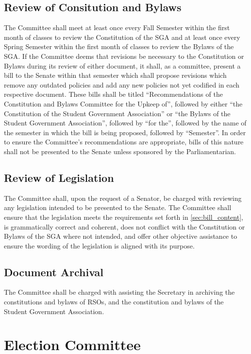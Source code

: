 \documentclass[12pt]{scrreprt}
\begin{document}
\subsection{Review of Consitution and Bylaws}
The Committee shall meet at least once every Fall Semester within the first month of classes to review the Constitution of the SGA and at least once every Spring Semester within the first month of classes to review the Bylaws of the SGA. If the Committee deems that revisions be necessary to the Constitution or Bylaws during its review of either document, it shall, as a committee, present a bill to the Senate within that semester which shall propose revisions which remove any outdated policies and add any new policies not yet codified in each respective document. These bills shall be titled “Recommendations of the Constitution and Bylaws Committee for the Upkeep of”, followed by either “the Constitution of the Student Government Association” or “the Bylaws of the Student Government Association”, followed by “for the”, followed by the name of the semester in which the bill is being proposed, followed by “Semester”. In order to ensure the Committee’s recommendations are appropriate, bills of this nature shall not be presented to the Senate unless sponsored by the Parliamentarian.

\subsection{Review of Legislation}
The Committee shall, upon the request of a Senator, be charged with reviewing any legislation intended to be presented to the Senate. The Committee shall ensure that the legislation meets the requirements set forth in \ref{sec:bill_content}, is grammatically correct and coherent, does not conflict with the Constitution or Bylaws of the SGA where not intended, and offer other objective assistance to ensure the wording of the legislation is aligned with its purpose.

\subsection{Document Archival} \label{sec:document_archival}
The Committee shall be charged with assisting the Secretary in archiving the 
constitutions and bylaws of RSOs, and the constitution and bylaws of the 
Student Government Association.

\section{Election Committee}
\end{document}
